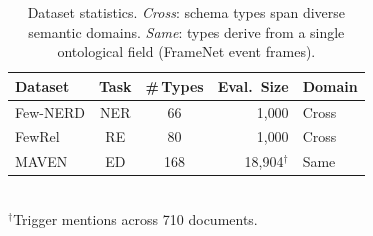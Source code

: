 \begin{table}[t]
\centering
\small
\caption{Dataset statistics. \emph{Cross}: schema types span diverse semantic domains. \emph{Same}: types derive from a single ontological field (FrameNet event frames).}
\label{tab:datasets}
\begin{tabular}{@{}lccrl@{}}
\toprule
\textbf{Dataset} & \textbf{Task} & \textbf{\#\,Types} & \textbf{Eval.\ Size} & \textbf{Domain} \\
\midrule
Few-NERD & NER & 66 & 1{,}000 & Cross \\
FewRel   & RE  & 80 & 1{,}000 & Cross \\
MAVEN    & ED  & 168 & 18{,}904$^\dagger$ & Same \\
\bottomrule
\end{tabular}
\vspace{1mm}\\
{\footnotesize $^\dagger$Trigger mentions across 710 documents.}
\end{table}

